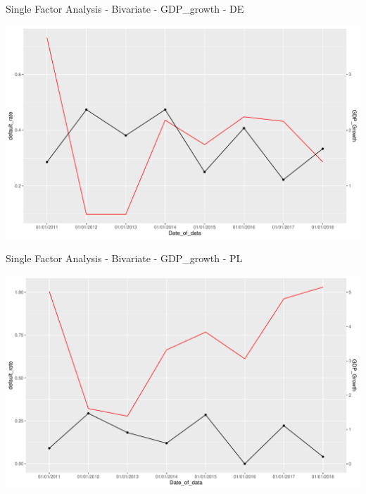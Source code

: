 \documentclass[9pt,ignorenonframetext,]{beamer}
\begin{document}
\begin{frame}{Single Factor Analysis - Bivariate - GDP\_growth - DE}

\includegraphics{Risk-Models-Development-Process_files/figure-beamer/unnamed-chunk-42-1.pdf}

\end{frame}

\begin{frame}{Single Factor Analysis - Bivariate - GDP\_growth - PL}

\includegraphics{Risk-Models-Development-Process_files/figure-beamer/unnamed-chunk-43-1.pdf}

\end{frame}
\end{document}
